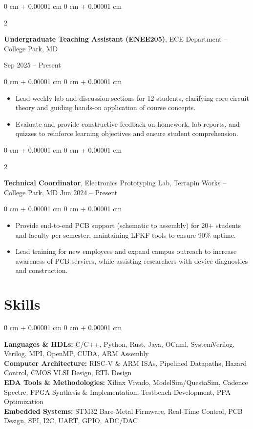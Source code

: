 \documentclass[10pt, letterpaper]{article}
\newenvironment{highlights}{
    \begin{itemize}[
        topsep=0.05 cm,
        parsep=0.05 cm,
        partopsep=0pt,
        itemsep=0pt,
        leftmargin=0 cm + 10pt
    ]
}{
    \end{itemize}
}
\newenvironment{onecolentry}{
    \begin{adjustwidth}{
        0 cm + 0.00001 cm
    }{
        0 cm + 0.00001 cm
    }
}{
    \end{adjustwidth}
}
\newenvironment{twocolentry}[2][]{
    \onecolentry
    \def\secondColumn{#2}
    \setcolumnwidth{\fill, 4.5 cm}
    \begin{paracol}{2}
}{
    \switchcolumn \raggedleft \secondColumn
    \end{paracol}
    \endonecolentry
}
\begin{document}
        \vspace{0.15 cm}
        
        \begin{twocolentry}{
            Sep 2025 – Present
        }
            \textbf{Undergraduate Teaching Assistant (ENEE205)}, ECE Department -- College Park, MD
        \end{twocolentry}
        \vspace{0.05 cm}
        \begin{onecolentry}
            \begin{highlights}
                \item Lead weekly lab and discussion sections for 12 students, clarifying core circuit theory and guiding hands-on application of course concepts.
                \item Evaluate and provide constructive feedback on homework, lab reports, and quizzes to reinforce learning objectives and ensure student comprehension.
            \end{highlights}
        \end{onecolentry}
        
        \vspace{0.15 cm}

        \begin{twocolentry}{
            Jun 2024 – Present
        }
            \textbf{Technical Coordinator}, Electronics Prototyping Lab, Terrapin Works -- College Park, MD \end{twocolentry}
        \vspace{0.05 cm}
        \begin{onecolentry}
            \begin{highlights}
                \item Provide end-to-end PCB support (schematic to assembly) for 20+ students and faculty per semester, maintaining LPKF tools to ensure 90\% uptime.
                \item Lead training for new employees and expand campus outreach to increase awareness of PCB services, while assisting researchers with device diagnostics and construction.
            \end{highlights}
        \end{onecolentry}
    \section{Skills}
        \begin{onecolentry}
            \textbf{Languages \& HDLs:} C/C++, Python, Rust, Java, OCaml, SystemVerilog, Verilog, MPI, OpenMP, CUDA, ARM Assembly \\
            \textbf{Computer Architecture:} RISC-V \& ARM ISAs, Pipelined Datapaths, Hazard Control, CMOS VLSI Design, RTL Design \\
            \textbf{EDA Tools \& Methodologies:} Xilinx Vivado, ModelSim/QuestaSim, Cadence Spectre, FPGA Synthesis \& Implementation, Testbench Development, PPA Optimization \\
            \textbf{Embedded Systems:} STM32 Bare-Metal Firmware, Real-Time Control, PCB Design, SPI, I2C, UART, GPIO, ADC/DAC
        \end{onecolentry}
\end{document}
